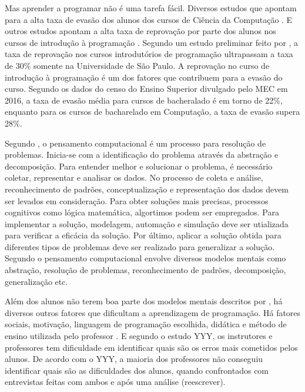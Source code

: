Mas aprender a programar não é uma tarefa fácil. Diversos estudos que apontam para a alta taxa de evasão dos alunos dos cursos de Ciência da Computação \citep{Watson:2014:FRI:2591708.2591749}. E outros estudos apontam a alta taxa de reprovação por parte dos alunos nos cursos de introdução à programação \citep{Watson:2014:FRI:2591708.2591749, bosse:2015:cbie}. Segundo um estudo preliminar feito por \cite{bosse:2015:cbie}, a taxa de reprovação nos cursos introdutórios de programação ultrapassam a taxa de 30\% somente na Universidade de São Paulo. A reprovação no curso de introdução à programação é um dos fatores que contribuem para a evasão do curso. Segundo os dados do censo do Ensino Superior divulgado pelo MEC em 2016, a taxa de evasão média para cursos de bacheralado é em torno de 22\%, enquanto para os cursos de bacharelado em Computação, a taxa de evasão supera 28\%.

Segundo \cite{Kalelioglu:2016}, o pensamento computacional é um processo para resolução de problemas. Inicia-se com a identificação do problema através da abstração e decomposição. Para entender melhor e solucionar o problema, é necessário coletar, representar e analisar os dados. No processo de coleta e análise, reconhecimento de padrões, conceptualização e representação dos dados devem ser levados em consideração. Para obter soluções mais precisas, processos cognitivos como lógica matemática, algortimos podem ser empregados. Para implementar a solução, modelagem, automação e simulação deve ser utializada para verificar a eficácia da solução. Por último, aplicar a solução obtida para diferentes tipos de problemas deve ser realizado para generalizar a solução. Segundo \cite{Kalelioglu:2016} o pensamento computacional envolve diversos modelos mentais como abstração, resolução de problemas, reconhecimento de padrões, decomposição, generalização etc.

Além dos alunos não terem boa parte dos modelos mentais descritos por \cite{Kalelioglu:2016}, há diversos outros fatores que dificultam a aprendizagem de programação. Há fatores sociais, motivação, linguagem de programação escolhida, didática e método de ensino utilizada pelo professor \citep{bosse:2017}. E segundo o estudo YYY, os instrutores e professores tem dificuldade em identificar quais são os erros mais cometidos pelos alunos. De acordo com o YYY, a maioria dos professores não conseguiu identificar quais são as dificuldades dos alunos, quando confrontados com entrevistas feitas com ambos e após uma análise (reescrever).

